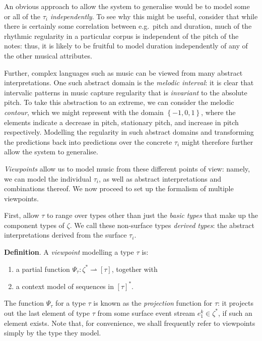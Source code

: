 \documentclass[12pt,a4paper,twoside,openright]{report}
\newcommand{\set}[1]{ \left\{ #1 \right\} }
\begin{document}
An obvious approach to allow the system to generalise would be to model some or
all of the $\tau_i$ \emph{independently}. To see why this might be useful,
consider that while there is certainly some correlation between e.g.\ pitch and
duration, much of the rhythmic regularity in a particular corpus is independent
of the pitch of the notes: thus, it is likely to be fruitful to model duration
independently of any of the other musical attributes.

Further, complex languages such as music can be viewed from many abstract
interpretations. One such abstract domain is the \emph{melodic interval}: it is
clear that intervalic patterns in music capture regularity that is
\emph{invariant} to the absolute pitch. To take this abstraction to an extreme,
we can consider the melodic \emph{contour}, which we might represent with the
domain $\set{-1,0,1}$, where the elements indicate a decrease in pitch,
stationary pitch, and increase in pitch respectively.  Modelling the regularity
in such abstract domains and transforming the predictions back into predictions
over the concrete $\tau_i$ might therefore further allow the system to
generalise.  

\emph{Viewpoints} allow us to model music from these different points of view:
namely, we can model the individual $\tau_i$, as well as abstract
interpretations and combinations thereof. We now proceed to set up the formalism
of multiple viewpoints.

First, allow $\tau$ to range over types other than just the \emph{basic types}
that make up the component types of $\zeta$. We call these non-surface types
\emph{derived types}: the abstract interpretations derived from the surface
$\tau_i$. 

\textbf{Definition}. A \emph{viewpoint} modelling a type $\tau$ is:
\begin{enumerate}[label=\arabic*., itemsep=0mm]
  \item a partial function $\Psi_\tau : \zeta^* \rightharpoonup [\tau]$,
    together with
  \item a context model of sequences in $[\tau]^*$.
\end{enumerate}

The function $\Psi_\tau$ for a type $\tau$ is known as the \emph{projection}
function for $\tau$: it projects out the last element of type $\tau$ from some
surface event stream $e_1^k \in \zeta^*$, if such an element exists. Note that,
for convenience, we shall frequently refer to viewpoints simply by the type they
model. 
\end{document}
